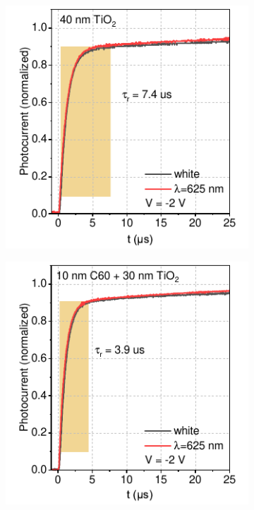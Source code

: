 \begin{figure}[t]
    \centering
    \begin{subfigure}[t]{0.45\textwidth}
        \centering
        \includegraphics[width=\textwidth]{chapters/transport_layers/images/Rise_time_40TiO2.pdf} %
        \caption{}
        \label{}
    \end{subfigure}
    \hfill
    \begin{subfigure}[t]{0.45\textwidth}
        \centering
        \includegraphics[width=\textwidth]{chapters/transport_layers/images/Rise_time_10_30.pdf} 

\end{subfigure}
\end{figure}
